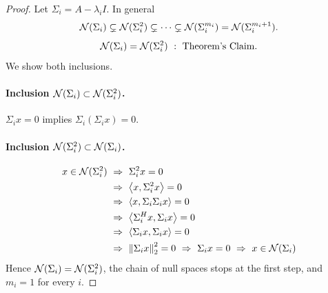\begin{proof}[Proof]
Let $\Sigma_i=A-\lambda_iI$. In general
\[
\mathcal{N}(\Sigma_i)\subsetneq\mathcal{N}(\Sigma_i^2)\subsetneq\cdots\subsetneq\mathcal{N}(\Sigma_i^{m_i})=\mathcal{N}(\Sigma_i^{m_i+1}).
\]
\[
\Null(\Sigma_i)=\Null(\Sigma_i^2)\ :\ \text{Theorem's Claim.}
\]
We show both inclusions.

\paragraph{Inclusion $\mathcal{N}(\Sigma_i)\subset\mathcal{N}(\Sigma_i^2)$.} $\Sigma_ix=0$ implies $\Sigma_i(\Sigma_ix)=0$. \checkmark

\paragraph{Inclusion $\mathcal{N}(\Sigma_i^2)\subset\mathcal{N}(\Sigma_i)$.}
\begin{align*}
x\in\Null(\Sigma_i^2)\ &\Rightarrow\ \Sigma_i^2x=0\\
&\Rightarrow\ \inner{x}{\Sigma_i^2x}=0\\
&\Rightarrow\ \inner{x}{\Sigma_i\Sigma_ix}=0\\
&\Rightarrow\ \inner{\Sigma_i\Hm x}{\Sigma_ix}=0\\
&\Rightarrow\ \inner{\Sigma_ix}{\Sigma_ix}=0\\
&\Rightarrow\ \norm{\Sigma_ix}_2^2=0\ \Rightarrow\ \Sigma_ix=0\ \Rightarrow\ x\in\Null(\Sigma_i)
\end{align*}
Hence $\mathcal{N}(\Sigma_i)=\mathcal{N}(\Sigma_i^2)$, the chain of null spaces stops at the first step, and $m_i=1$ for every $i$.
\end{proof}

